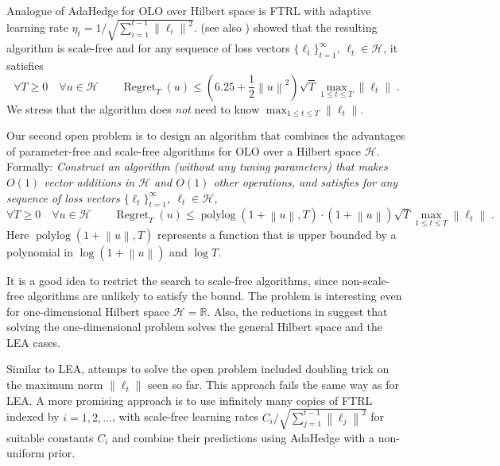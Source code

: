 \documentclass{colt2016} %
\DeclareMathOperator{\Regret}{Regret}
\DeclareMathOperator{\polylog}{polylog}
\newcommand{\R}{\mathbb{R}}     %
\renewcommand{\H}{\mathcal{H}}  %
\newcommand{\norm}[1]{\left\|{#1}\right\|}
\begin{document}
Analogue of AdaHedge for OLO over Hilbert space is FTRL with adaptive learning
rate $\eta_t = 1/\sqrt{\sum_{i=1}^{t-1} \norm{\ell_i}^2}$.
\cite{Orabona-Pal-2015} (see also \cite{Orabona-Pal-2016-scale-free}) showed
that the resulting algorithm is scale-free and for any sequence of loss vectors
$\{\ell_t\}_{t=1}^\infty$, $\ell_t \in \H$, it satisfies
$$
\forall T \ge 0 \quad \forall u \in \H \qquad \Regret_T(u) \le \left(6.25 + \frac{1}{2}\norm{u}^2 \right) \sqrt{T} \max_{1 \le t \le T} \norm{\ell_t} \; .
$$
We stress that the algorithm does \emph{not} need to know $\max_{1 \le t \le T}
\norm{\ell_t}$.

Our second open problem is to design an algorithm that combines the advantages
of parameter-free and scale-free algorithms for OLO over a Hilbert space $\H$.
Formally: \emph{Construct an algorithm (without any tuning parameters) that
makes $O(1)$ vector additions in $\H$ and $O(1)$ other operations, and
satisfies for any sequence of loss vectors $\{\ell_t\}_{t=1}^\infty$, $\ell_t
\in \H$,}
$$
\forall T \ge 0 \quad \forall u \in \H \qquad
\Regret_T(u) \le \polylog(1 + \norm{u}, T) \cdot (1 + \norm{u}) \sqrt{T} \max_{1 \le t \le T} \norm{\ell_t} \; .
$$
Here $\polylog(1 + \norm{u}, T)$ represents a function that is upper bounded by
a polynomial in $\log(1+\norm{u})$ and $\log T$.

It is a good idea to restrict the search to scale-free algorithms, since
non-scale-free algorithms are unlikely to satisfy the bound. The problem is
interesting even for one-dimensional Hilbert space $\H = \R$. Also, the
reductions in \cite{Orabona-Pal-2016-parameter-free} suggest that solving the
one-dimensional problem solves the general Hilbert space and the LEA cases.

Similar to LEA, attemps to solve the open problem included doubling trick on
the maximum norm $\norm{\ell_t}$ seen so far. This approach fails the same way
as for LEA. A more promising approach is to use infinitely many copies of FTRL
indexed by $i=1,2,\dots$, with scale-free learning rates
$C_i/\sqrt{\sum_{j=1}^{t-1} \norm{\ell_j}^2}$ for suitable constants $C_i$ and
combine their predictions using AdaHedge with a non-uniform prior.


\end{document}
